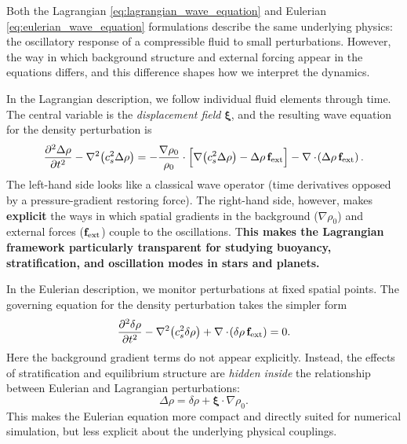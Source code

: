 Both the Lagrangian \eqref{eq:lagrangian_wave_equation} and Eulerian 
\eqref{eq:eulerian_wave_equation} formulations describe the same underlying physics: 
the oscillatory response of a compressible fluid to small perturbations.  
However, the way in which background structure and external forcing appear in the 
equations differs, and this difference shapes how we interpret the dynamics.
\par
In the Lagrangian description, we follow individual fluid elements through time.  
The central variable is the \emph{displacement field} $\boldsymbol{\xi}$, and the 
resulting wave equation for the density perturbation is
\[
\frac{\partial^2 \Delta \rho}{\partial t^2} 
- \nabla^2 \!\left(c_s^2 \Delta \rho\right)
= - \frac{\nabla \rho_0}{\rho_0} \cdot 
\Big[\nabla \!\left(c_s^2 \Delta \rho\right) - \Delta \rho\, {\bf f}_{\rm ext}\Big]
- \nabla \cdot \!\left(\Delta \rho\, {\bf f}_{\rm ext}\right).
\]
The left-hand side looks like a classical wave operator (time derivatives opposed by a pressure-gradient restoring force). The right-hand side, however, makes \textbf{explicit} the ways in which spatial gradients in the background ($\nabla \rho_0$) and external forces (${\bf f}_{\rm ext}$) couple to the oscillations.  T\textbf{his makes the Lagrangian framework particularly transparent for studying buoyancy, stratification, and oscillation modes in stars and planets.}
\par
In the Eulerian description, we monitor perturbations at fixed spatial points.  
The governing equation for the density perturbation takes the simpler form
\[
\frac{\partial^2 \delta \rho}{\partial t^2}
- \nabla^2 \!\left(c_s^2 \delta \rho\right)
+ \nabla \cdot \!\left( \delta \rho\, \mathbf{f}_{\rm ext} \right) = 0.
\]
Here the background gradient terms do not appear explicitly.  
Instead, the effects of stratification and equilibrium structure are 
\emph{hidden inside} the relationship between Eulerian and Lagrangian perturbations:
\[
\Delta \rho = \delta \rho + \boldsymbol{\xi}\cdot\nabla \rho_0.
\]
This makes the Eulerian equation more compact and directly suited for numerical 
simulation, but less explicit about the underlying physical couplings.


